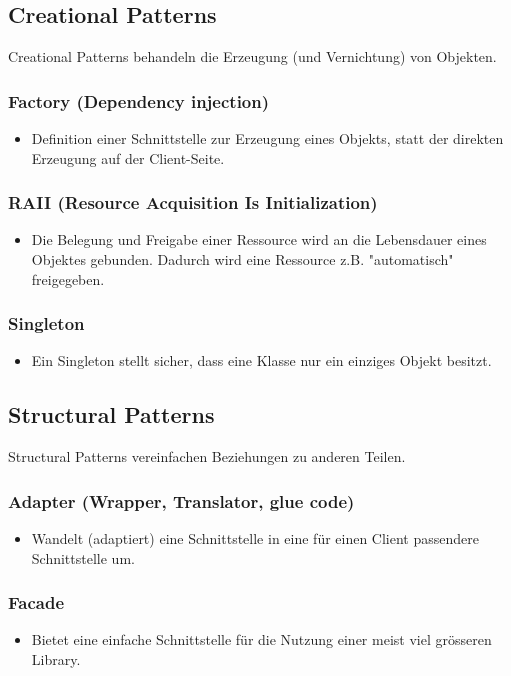 \subsection{Creational Patterns}
Creational Patterns behandeln die Erzeugung (und Vernichtung) von Objekten.
\subsubsection{Factory (Dependency injection)}
  \begin{itemize}
  \item Definition einer Schnittstelle zur Erzeugung eines Objekts, statt der direkten Erzeugung auf der Client-Seite.
  \end{itemize}
\subsubsection{RAII (Resource Acquisition Is Initialization)}
  \begin{itemize}
  \item Die Belegung und Freigabe einer Ressource wird an die Lebensdauer eines Objektes gebunden. Dadurch wird eine Ressource z.B. "automatisch" freigegeben.
  \end{itemize}
\subsubsection{Singleton}
  \begin{itemize}
  \item Ein Singleton stellt sicher, dass eine Klasse nur ein einziges Objekt besitzt.
  \end{itemize}

\subsection{Structural Patterns}
Structural Patterns vereinfachen Beziehungen zu anderen Teilen.
\subsubsection{Adapter (Wrapper, Translator, glue code)}
  \begin{itemize}
  \item Wandelt (adaptiert) eine Schnittstelle in eine für einen Client passendere Schnittstelle um.
  \end{itemize}
\subsubsection{Facade}
  \begin{itemize}
  \item Bietet eine einfache Schnittstelle für die Nutzung einer meist viel grösseren Library.
  \end{itemize}
